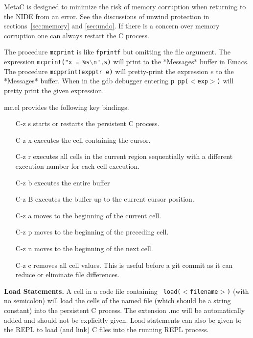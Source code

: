 \documentclass{article}
\begin{document}
MetaC is designed to minimize the risk of memory corruption
when returning to the NIDE from an error.
See the discussions of unwind protection in sections~\ref{sec:memory} and \ref{sec:undo}.
If there is a concern over memory corruption one can always restart the C process.

 The procedure {\tt mcprint} is like {\tt fprintf} but omitting the file argument. The expression
{\tt mcprint("x = \%s$\backslash$n",s)} will print to the *Messages* buffer in Emacs. The procedure {\tt mcpprint(expptr e)}
will pretty-print the expression $e$ to the *Messages* buffer.  When in the gdb debugger entering {\tt p pp($<$exp$>$)} will
pretty print the given expression.

  mc.el provides the following key bindings.

\begin{itemize}
\item[C-z s] starts or restarts the persistent C process.

\item[C-z x] executes the cell containing the cursor.
  
\item[C-z r] executes all cells in the current region sequentially with a different execution number for each cell execution.

\item[C-z b] executes the entire buffer

\item[C-z B] executes the buffer up to the current cursor position.
  
\item[C-z a] moves to the beginning of the current cell.

\item[C-z p] moves to the beginning of the preceding cell.

\item[C-z n] moves to the beginning of the next cell.

\item[C-z c] removes all cell values.  This is useful before a git commit as it can reduce or eliminate file differences.
\end{itemize}

{\bf Load Statements.}  A cell in a code file containing {\tt
load($<$filename$>$)} (with no semicolon) will load the cells
of the named file (which should be a string constant) into the persistent C process.  The extension .mc
will be automatically added and should not be explicitly given.
Load statements can also be given to the REPL to load (and link) C
files into the running REPL process.
\end{document}

